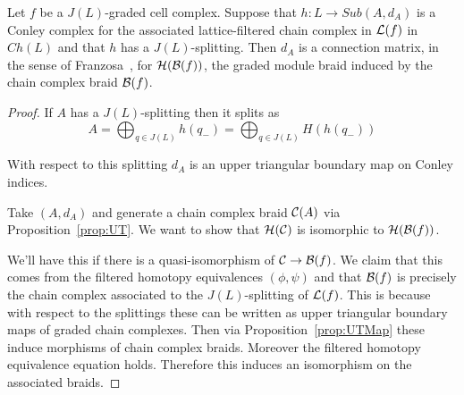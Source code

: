 %


\begin{thm}
Let $f$ be a $J(L)$-graded cell complex.  Suppose that $h:L\to Sub(A,d_A)$ is a Conley complex for the associated lattice-filtered chain complex in ${\mathcal L}(f)$ in $Ch(L)$ and that $h$ has a $J(L)$-splitting.  Then $d_A$ is a connection matrix, in the sense of Franzosa~\cite[Definition 3.6]{fran}, for ${\mathcal H}({\mathcal B}(f))$, the graded module braid induced by the chain complex braid ${\mathcal B}(f)$.
\end{thm}
\begin{proof}
If $A$ has a $J(L)$-splitting then it splits as $$A=\bigoplus_{q\in J(L)} h(q_-)=\bigoplus_{q\in J(L)} H(h(q_-))$$

 With respect to this splitting $d_A$ is an upper triangular boundary map on Conley indices.
 
 Take $(A,d_A)$ and generate a chain complex braid ${\mathcal C}(A)$ via Proposition~\ref{prop:UT}.  We want to show that ${\mathcal H}({\mathcal C})$ is isomorphic to ${\mathcal H}({\mathcal B}(f))$.
 
 We'll have this if there is a quasi-isomorphism of ${\mathcal C}\to {\mathcal B}(f)$.  We claim that this comes from the filtered homotopy equivalences $(\phi,\psi)$ and that ${\mathcal B}(f)$ is precisely the chain complex associated to the $J(L)$-splitting of ${\mathcal L}(f)$.  This is because with respect to the splittings these can be written as upper triangular boundary maps of graded chain complexes.  Then via Proposition~\ref{prop:UTMap} these induce morphisms of chain complex braids.  Moreover the filtered homotopy equivalence equation holds.  Therefore this induces an isomorphism on the associated braids.
 

\end{proof}

%



